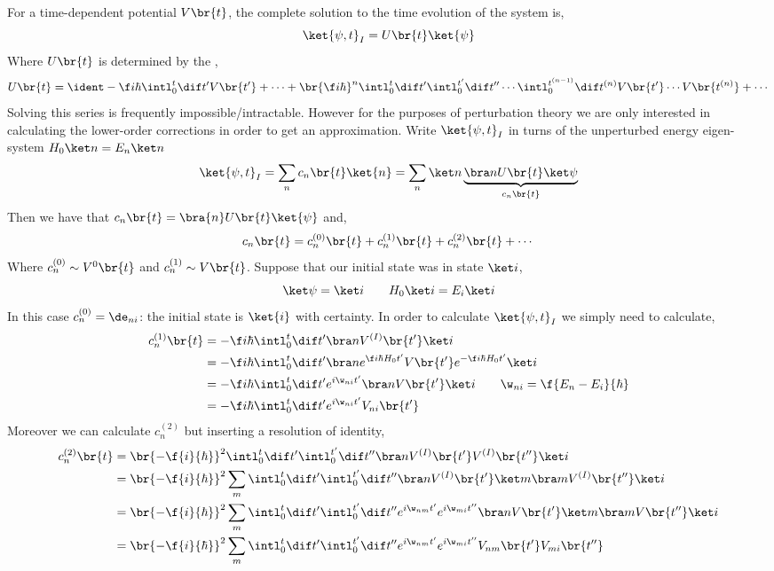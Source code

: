 \documentclass{article}
\begin{document}
For a time-dependent potential $V\br{t}$, the complete solution to the time evolution of the system is,
\[ \ket{\psi, t}_{I} = U\br{t} \ket{\psi} \]
Where $U\br{t}$ is determined by the ,
\[ U\br{t} = \ident - \f i \hbar \intl_{0}^{t} \dif t' V\br{t'} + \cdots + \br{\f i \hbar}^n \intl_{0}^{t} \dif t' \intl_{0}^{t'} \dif t'' \cdots \intl_{0}^{t^{(n-1)}} \dif t^{(n)} V\br{t'} \cdots V\br{t^{(n)}} + \cdots \]
Solving this series is frequently impossible/intractable. However for the purposes of perturbation theory we are only interested in calculating the lower-order corrections in order to get an approximation. Write $\ket{\psi, t}_I$ in turns of the unperturbed energy eigen-system $H_0 \ket n = E_n \ket n$
\[ \ket{\psi, t}_{I} = \sum_n c_n\br{t} \ket{n} = \sum_n \ket n \underbrace{\bra n U\br{t} \ket \psi}_{c_n\br{t}} \]
Then we have that $c_n\br{t} = \bra{n} U\br{t} \ket{\psi}$ and,
\[ c_n\br{t} = c_n^{(0)}\br{t} + c_n^{(1)}\br{t} + c_n^{(2)}\br{t} + \cdots\]
Where $c_n^{(0)} \sim V^{0}\br{t}$ and $c_n^{(1)} \sim V\br{t}$. Suppose that our initial state was in state $\ket i$,
\[ \ket \psi = \ket i \qquad H_0 \ket i = E_i \ket i \]
In this case $c_n^{(0)} = \de_{ni}$: the initial state is $\ket{i}$ with certainty. In order to calculate $\ket{\psi, t}_I$ we simply need to calculate,
\begin{align*}
    c_n^{(1)}\br{t}
    &= - \f i \hbar \intl_{0}^{t} \dif t' \bra n V^{(I)} \br{t'} \ket i \\
    &= - \f i \hbar \intl_{0}^{t} \dif t' \bra n e^{\f i \hbar H_0 t'} V \br{t'}  e^{-\f i \hbar H_0 t'}\ket i \\
    &= - \f i \hbar \intl_{0}^{t} \dif t' e^{i \w_{ni} t'}  \bra n V \br{t'}\ket i \qquad \w_{ni} = \f{E_n - E_i}{\hbar} \\
    &= - \f i \hbar \intl_{0}^{t} \dif t' e^{i \w_{ni} t'}  V_{ni}\br{t'}
\end{align*}
Moreover we can calculate $c_n^{(2)}$ but inserting a resolution of identity,
\begin{align*}
    c_n^{(2)}\br{t}
    &= \br{-\f{i}{\hbar}}^2 \intl_{0}^{t} \dif t' \intl_{0}^{t'} \dif t'' \bra n V^{(I)}\br{t'} V^{(I)}\br{t''} \ket i  \\
    &= \br{-\f{i}{\hbar}}^2  \sum_{m}\intl_{0}^{t} \dif t' \intl_{0}^{t'} \dif t'' \bra n V^{(I)}\br{t'} \ket m \bra m V^{(I)}\br{t''} \ket i  \\
    &= \br{-\f{i}{\hbar}}^2  \sum_{m}\intl_{0}^{t} \dif t' \intl_{0}^{t'} \dif t'' e^{i \w_{nm} t'}e^{i \w_{mi} t''} \bra n V\br{t'} \ket m \bra m V\br{t''} \ket i  \\
    &= \br{-\f{i}{\hbar}}^2  \sum_{m}\intl_{0}^{t} \dif t' \intl_{0}^{t'} \dif t'' e^{i \w_{nm} t'}e^{i \w_{mi} t''} V_{nm}\br{t'}V_{mi}\br{t''}
\end{align*}
\end{document}
